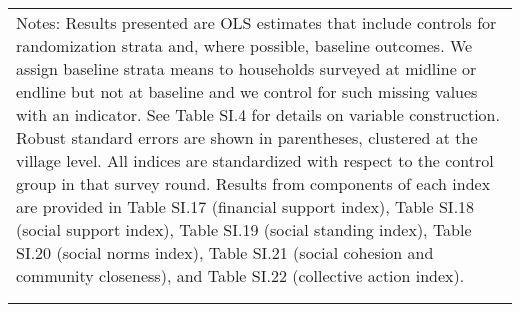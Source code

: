 \begin{longtable}{llcccccccccc}
\multicolumn{12}{p{\textwidth}}{{Notes: Results presented are OLS estimates that include controls for randomization strata and, where possible, baseline outcomes. We assign baseline strata means to households surveyed at midline or endline but not at baseline and we control for such missing values with an indicator. See Table SI.4 for details on variable construction. Robust standard errors are shown in parentheses, clustered at the village level. All indices are standardized with respect to the control group in that survey round. Results from components of each index are provided in Table SI.17 (financial support index), Table SI.18 (social support index), Table SI.19 (social standing index), Table SI.20 (social norms index), Table SI.21 (social cohesion and community closeness), and Table SI.22 (collective action index).}} \\                                           
\multicolumn{12}{p{\textwidth}}{{}} \\                                                                                                                                                                                                                                                                                                                                                                                                                                                                                                                                                                                                                                                                                                                                                                                                                                                                            
\endlastfoot                                                                                                                                                                                                                                                                                                                                                                                                                                                                                                                                                                                                                                                                                                                                                                                                                                                                                                      

\end{longtable}
